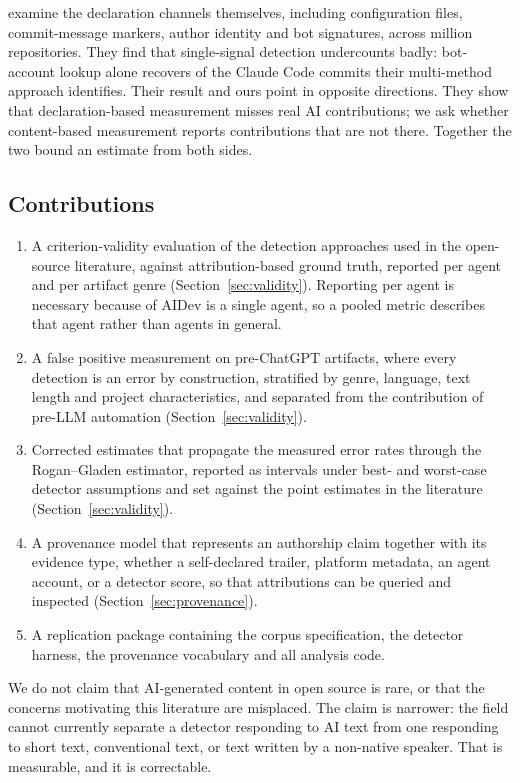 \citet{khosravani2026census} examine the declaration channels themselves, including
configuration files, commit-message markers, author identity and bot signatures, across
 million repositories. They find that single-signal detection undercounts
badly: bot-account lookup alone recovers  of the Claude Code commits
their multi-method approach identifies. Their result and ours point in opposite
directions. They show that declaration-based measurement misses real AI contributions;
we ask whether content-based measurement reports contributions that are not there.
Together the two bound an estimate from both sides.

\subsection{Contributions}
\label{sec:intro:contributions}

\begin{enumerate}
  \item A criterion-validity evaluation of the detection approaches used in the
    open-source literature, against attribution-based ground truth, reported per agent
    and per artifact genre (Section~\ref{sec:validity}). Reporting per agent is
    necessary because \AidevTopAgentShare{} of AIDev is a single agent, so a pooled
    metric describes that agent rather than agents in general.
  \item A false positive measurement on pre-ChatGPT artifacts, where every detection is
    an error by construction, stratified by genre, language, text length and project
    characteristics, and separated from the contribution of pre-LLM automation
    (Section~\ref{sec:validity}).
  \item Corrected estimates that propagate the measured error rates through the
    Rogan--Gladen estimator, reported as intervals under best- and worst-case detector
    assumptions and set against the point estimates in the literature
    (Section~\ref{sec:validity}).
  \item A provenance model that represents an authorship claim together with its
    evidence type, whether a self-declared trailer, platform metadata, an agent account,
    or a detector score, so that attributions can be queried and inspected
    (Section~\ref{sec:provenance}).
  \item A replication package containing the corpus specification, the detector harness,
    the provenance vocabulary and all analysis code.
\end{enumerate}

We do not claim that AI-generated content in open source is rare, or that the concerns
motivating this literature are misplaced. The claim is narrower: the field cannot
currently separate a detector responding to AI text from one responding to short text,
conventional text, or text written by a non-native speaker. That is measurable, and it
is correctable.
